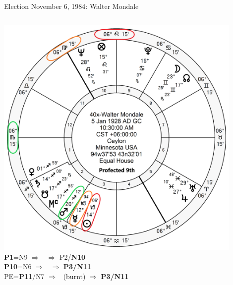 \begin{frame}[t]{Election November 6, 1984: Walter Mondale}
\begin{columns}[T, onlytextwidth]
\vspace{-1em}
{\includegraphics[width=0.9\textwidth]{charts/Mondale-Prof-9th.png}}
\fontsize{8pt}{9pt}\selectfont
\textbf{\dgreen P1}=N9
	$\Rightarrow$ \Mars\, $\Rightarrow$ P2/\textbf{\red N10}\\
\textbf{\red P10}=N6
	$\Rightarrow$ \Sun\, $\Rightarrow$ \textbf{\red P3/N11}\\
PE=\textbf{\red P11}/N7
	 $\Rightarrow$ \Mercury\, (burnt) $\Rightarrow$ \textbf{\red P3/N11}

\end{columns}
\end{frame}
